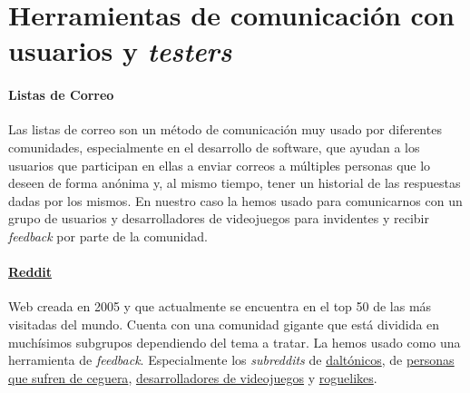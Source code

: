 \section{Herramientas de comunicación con usuarios y \textit{testers}}

\paragraph{Listas de Correo} Las listas de correo son un método de comunicación muy usado por diferentes comunidades, especialmente en el desarrollo de software, que ayudan a los usuarios que participan en ellas a enviar correos a múltiples personas que lo deseen de forma anónima y, al mismo tiempo, tener un historial de las respuestas dadas por los mismos. En nuestro caso la hemos usado para comunicarnos con un grupo de usuarios y desarrolladores de videojuegos para invidentes y recibir \textit{feedback} por parte de la comunidad.

 \paragraph{\href{www.reddit.com}{Reddit}} Web creada en 2005 y que actualmente se encuentra en el top 50 de las más visitadas del mundo. Cuenta con una comunidad gigante que está dividida en muchísimos subgrupos dependiendo del tema a tratar. La hemos usado como una herramienta de \textit{feedback}. Especialmente los \textit{subreddits} de \href{https://www.reddit.com/r/ColorBlind/}{daltónicos}, de \href{https://www.reddit.com/r/blind/}{personas que sufren de ceguera}, \href{https://www.reddit.com/r/gamedev/}{desarrolladores de videojuegos} y \href{https://www.reddit.com/r/roguelikes/}{roguelikes}.
